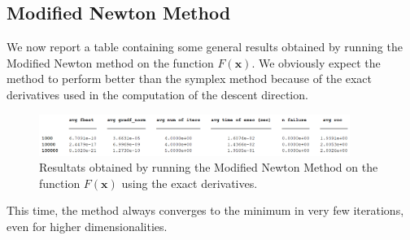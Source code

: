 \subsection*{Modified Newton Method}
We now report a table containing some general results obtained by running the Modified Newton method on the function $F(\mathbf{x})$.
We obviously expect the method to perform better than the symplex method because of the exact derivatives used in the computation of the descent direction.

\begin{figure}[htbp]
    \centering
    \includegraphics[width = 0.9\textwidth]{img/pb76_table_MN.png}
    \caption{Resultats obtained by running the Modified Newton Method on the function $F(\mathbf{x})$ using the exact derivatives.}
\end{figure}

This time, the method always converges to the minimum in very few iterations, even for higher dimensionalities. 